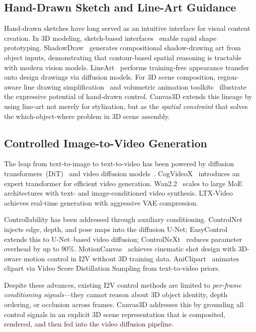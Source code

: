 \subsection{Hand-Drawn Sketch and Line-Art Guidance}

Hand-drawn sketches have long served as an intuitive interface for visual
content creation. In 3D modeling, sketch-based interfaces~\cite{olson2011sketch}
enable rapid shape prototyping. ShadowDraw~\cite{luo2026shadowdraw} generates
compositional shadow-drawing art from object inputs, demonstrating that
contour-based spatial reasoning is tractable with modern vision models.
LineArt~\cite{wang2024lineart} performs training-free appearance transfer onto
design drawings via diffusion models. For 3D scene composition, region-aware
line drawing simplification~\cite{nguyen2024region} and volumetric animation
toolkits~\cite{foxgieg2024lightning} illustrate the expressive potential of
hand-drawn control. Canvas3D extends this lineage by using line-art not merely
for stylization, but as the \textit{spatial constraint} that solves the
which-object-where problem in 3D scene assembly.

\subsection{Controlled Image-to-Video Generation}

The leap from text-to-image to text-to-video has been powered by diffusion
transformers~(DiT)~\cite{peebles2023dit} and video diffusion
models~\cite{ho2022vdm}. CogVideoX~\cite{yang2025cogvideox} introduces an expert
transformer for efficient video generation. Wan2.2~\cite{wan2025} scales to
large MoE architectures with text- and image-conditioned video synthesis.
LTX-Video~\cite{ltxvideo2024} achieves real-time generation with aggressive
VAE compression.

Controllability has been addressed through auxiliary conditioning.
ControlNet~\cite{zhang2023controlnet} injects edge, depth, and pose maps into
the diffusion U-Net; EasyControl~\cite{wang2024easycontrol} extends this to
U-Net--based video diffusion; ControlNeXt~\cite{peng2024controlnext} reduces
parameter overhead by up to 90\%. MotionCanvas~\cite{xing2025motioncanvas}
achieves cinematic shot design with 3D-aware motion control in I2V without
3D training data. AniClipart~\cite{wu2025aniclipart} animates clipart via
Video Score Distillation Sampling from text-to-video priors.

Despite these advances, existing I2V control methods are limited to
\textit{per-frame conditioning signals}---they cannot reason about 3D object
identity, depth ordering, or occlusion across frames. Canvas3D addresses
this by grounding all control signals in an explicit 3D scene representation
that is composited, rendered, and then fed into the video diffusion pipeline.

